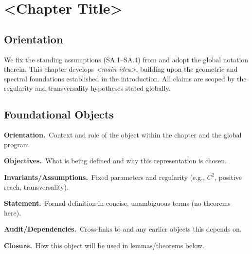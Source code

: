 
\chapter{<Chapter Title>}
\label{chap:<label>}

\providecommand{\Orientation}{\par\noindent\textbf{Orientation.}\ }
\providecommand{\Objectives}{\par\noindent\textbf{Objectives.}\ }
\providecommand{\Invariants}{\par\noindent\textbf{Invariants/Assumptions.}\ }
\providecommand{\Statement}{\par\noindent\textbf{Statement.}\ }
\providecommand{\ErrorBounds}{\par\noindent\textbf{Error bounds.}\ }
\providecommand{\Optimality}{\par\noindent\textbf{Optimality.}\ }
\providecommand{\Audit}{\par\noindent\textbf{Audit/Dependencies.}\ }
\providecommand{\Closure}{\par\noindent\textbf{Closure.}\ }

\section*{Orientation}
We fix the standing assumptions (SA.1--SA.4) from 
and adopt the global notation therein. This chapter develops \emph{<main idea>},
building upon the geometric and spectral foundations established in the introduction.
All claims are scoped by the regularity and transversality hypotheses stated globally.

\section{Foundational Objects}

\begin{definition}\label{def:<label>}
\Orientation Context and role of the object within the chapter and the global program.
\Objectives What is being defined and why this representation is chosen.
\Invariants Fixed parameters and regularity (e.g., $C^2$, positive reach, transversality).
\Statement Formal definition in concise, unambiguous terms (no theorems here).
\Audit Cross-links to  and any earlier objects this depends on.
\Closure How this object will be used in lemmas/theorems below.
\end{definition}

